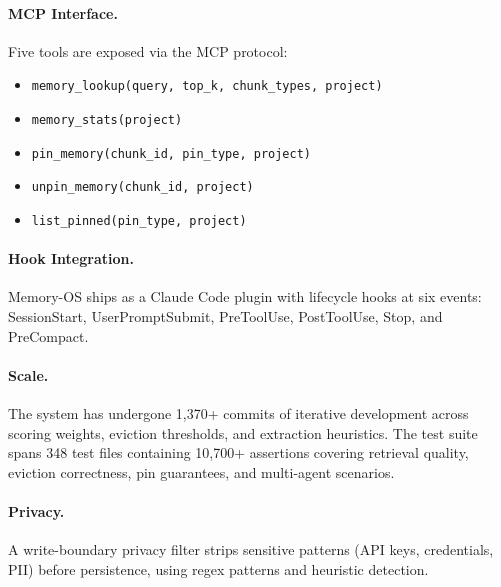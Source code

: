 \documentclass[10pt,twocolumn]{article}
\begin{document}
\paragraph{MCP Interface.} Five tools are exposed via the MCP protocol:
\begin{itemize}[leftmargin=*,nosep]
  \item \texttt{memory\_lookup(query, top\_k, chunk\_types, project)}
  \item \texttt{memory\_stats(project)}
  \item \texttt{pin\_memory(chunk\_id, pin\_type, project)}
  \item \texttt{unpin\_memory(chunk\_id, project)}
  \item \texttt{list\_pinned(pin\_type, project)}
\end{itemize}

\paragraph{Hook Integration.} Memory-OS ships as a Claude Code plugin with lifecycle hooks at six events: SessionStart, UserPromptSubmit, PreToolUse, PostToolUse, Stop, and PreCompact.

\paragraph{Scale.} The system has undergone 1{,}370+ commits of iterative development across scoring weights, eviction thresholds, and extraction heuristics. The test suite spans 348 test files containing 10{,}700+ assertions covering retrieval quality, eviction correctness, pin guarantees, and multi-agent scenarios.

\paragraph{Privacy.} A write-boundary privacy filter strips sensitive patterns (API keys, credentials, PII) before persistence, using regex patterns and heuristic detection.
\end{document}
